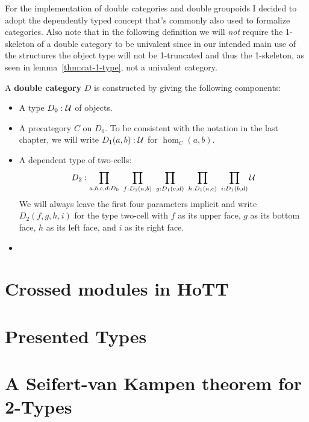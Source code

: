 For the implementation of double categories and double groupoids I decided to
adopt the dependently typed concept that's commonly also used to formalize categories.
Also note that in the following definition we will \emph{not} require the
1-skeleton of a double category to be univalent since in our intended main
use of the structures the object type will not be 1-truncated and thus the
1-skeleton, as seen in lemma~\ref{thm:cat-1-type}, not a univalent category.

\begin{defn}
A \textbf{double category} $D$ is constructed by giving the following components:
\begin{itemize}
\item A type $D_0 : \mathcal{U}$ of objects.
\item A precategory $C$ on $D_0$. To be consistent with the notation in the last
chapter, we will write $D_1(a, b) : \mathcal{U}$ for $\hom_C(a, b)$.
\item A dependent type of two-cells:
\begin{equation*}
D_2 : \prod_{a,b,c,d:D_0} ~ \prod_{f:D_1(a,b)} ~ \prod_{g:D_1(c,d)}
	~ \prod_{h:D_1(a,c)} ~ \prod_{i:D_1(b,d)} \mathcal{U}
\end{equation*}
We will always leave the first four parameters implicit and write $D_2(f,g,h,i)$
for the type two-cell with $f$ as its upper face, $g$ as its bottom face,
$h$ as its left face, and $i$ as its right face.
\item
\end{itemize}

\end{defn}

\section{Crossed modules in HoTT}

\section{Presented Types}

\section{A Seifert-van Kampen theorem for 2-Types}

